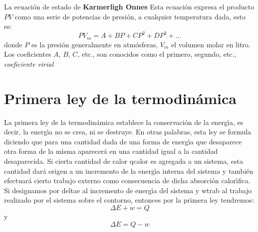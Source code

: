La ecuaci\'on de estado de \textbf{Karmerligh Onnes}  Esta ecuaci\'on expresa el producto $PV$ como una serie de potencias de presi\'on, a cualquier temperatura dada, esto es:
\begin{equation}
PV_m =A +BP + CP^2 + DP^3 + \ldots
\end{equation}
donde $P$ es la presi\'on generalmente en atm\'osferas, $V_m$ el volumen
molar en litro. Los coeficientes $A$, $B$, $C$, etc., son conocidos como el primero, segundo, etc., \textit{coeficiente virial}



\section{Primera ley de la termodin\'amica}
La primera ley de la termodin\'amica establece la conservaci\'on de la
energ\'{\i}a, es decir, la energ\'{\i}a no se crea, ni se destruye. En otras
palabras, esta ley se formula diciendo que para una cantidad dada de
una forma de e\-nerg\'{\i}a que desaparece otra forma de la misma
aparecer\'a en una cantidad igual a la cantidad desaparecida.
Si cierta cantidad de calor \gls{qcalor} es agregada a un sistema, esta cantidad dar\'a origen a un incremento de la energ\'{\i}a interna del sistema
y tambi\'en efectuar\'a cierto trabajo externo como consecuencia de dicha absorci\'on calor\'{\i}fica. Si designamos por \gls{deltae} al incremento de
energ\'{\i}a del sistema y \gls{wtrab} al trabajo realizado por el sistema sobre el contorno, entonces por la primera ley tendremos:
\begin{equation}
\Delta E + w = Q
\end{equation}
y
\begin{equation}
\Delta E = Q - w
\end{equation}

